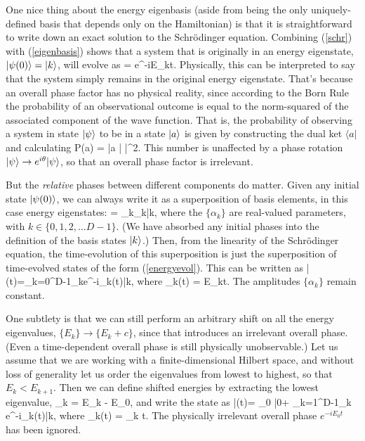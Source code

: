 \documentclass[aps,prd,nofootinbib,notitlepage,12pt]{revtex4-2}
\begin{document}
One nice thing about the energy eigenbasis (aside from being the only uniquely-defined basis that depends only on the Hamiltonian) is that it is straightforward to write down an exact solution to the Schr\"odinger equation.
Combining (\ref{schr}) with (\ref{eigenbasis}) shows that a system that is originally in an energy eigenstate, $\lvert \psi(0)\rangle = \lvert k\rangle$, will evolve as
\be
   = e^{-iE_kt}.
  \label{energyevol}
\ee
Physically, this can be interpreted to say that the system simply remains in the original energy eigenstate.
That's because an overall phase factor has no physical reality, since according to the Born Rule the probability of an observational outcome is equal to the norm-squared of the associated component of the wave function.
That is, the probability of observing a system in state $\lvert \psi\rangle$ to be in a state $\lvert a\rangle$ is given by constructing the dual ket $\langle a|$ and calculating
\be
  P(a) = |\langle a | \psi\rangle|^2.
\ee
This number is unaffected by a phase rotation $\lvert \psi\rangle \rightarrow e^{i\theta}\lvert \psi\rangle$, so that an overall phase factor is irrelevant.

But the \emph{relative} phases between different components do matter.
Given any initial state $\lvert \psi(0)\rangle$, we can always write it as a superposition of basis elements, in this case energy eigenstates:
\be
   = \sum_{k}{\alpha_k\left|k\right\rangle},
\ee
where the $\{\alpha_k\}$ are real-valued parameters, with $k\in \{0, 1, 2, \ldots D-1\}$.
(We have absorbed any initial phases into the definition of the basis states $\lvert k\rangle$.)
Then, from the linearity of the Schr\"odinger equation, the time-evolution of this superposition is just the superposition of time-evolved states of the form (\ref{energyevol}).
This can be written as
\be
\left|\psi\left(t\right)\right\rangle=\sum_{k=0}^{D-1}{\alpha_ke^{-i\theta_k(t)}\left|k\right\rangle},
\label{psi-evol}                         
\ee
where
\be
  \theta_k(t) = E_kt.
\ee
The amplitudes $\{\alpha_k\}$ remain constant.

One subtlety is that we can still perform an arbitrary shift on all the energy eigenvalues, $\{E_k\} \rightarrow \{ E_k + c\}$, since that introduces an irrelevant overall phase.
(Even a time-dependent overall phase is still physically unobservable.)
Let us assume that we are working with a finite-dimensional Hilbert space, and without loss of generality let us order the eigenvalues from lowest to highest, so that $E_k < E_{k+1}$.
Then we can define shifted energies by extracting the lowest eigenvalue,
\be
  \E_k = E_k - E_0,
\ee
and write the state as
\be
\left|\psi\left(t\right)\right\rangle= \alpha_0 |0\rangle + \sum_{k=1}^{D-1}{\alpha_k e^{-i\thetat_k(t)}\left|k\right\rangle}, 
  \label{finalstate}                  
\ee
where
\be
  \thetat_k(t) = \E_k t.
\ee
The physically irrelevant overall phase $e^{-iE_0t}$ has been ignored.
\end{document}
